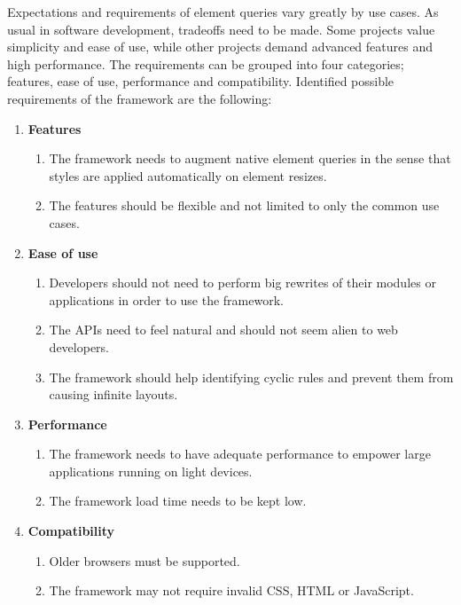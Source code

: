 \documentclass[a4paper,11pt]{kth-mag}
\begin{document}
        Expectations and requirements of element queries vary greatly by use cases.
        As usual in software development, tradeoffs need to be made.
        Some projects value simplicity and ease of use, while other projects demand advanced features and high performance.
        The requirements can be grouped into four categories; features, ease of use, performance and compatibility.
        Identified possible requirements of the framework are the following:
        \begin{enumerate}
          \item \textbf{Features}
            \begin{enumerate}
              \item\label{itm:req_resize_detect} The framework needs to augment \gls{native} element queries in the sense that styles are applied automatically on \gls{element} resizes.
              \item The features should be flexible and not limited to only the common use cases.
            \end{enumerate}
          \item \textbf{Ease of use}
            \begin{enumerate}
              \item\label{itm:req_big_rewrite} Developers should not need to perform big rewrites of their modules or applications in order to use the framework.
              \item\label{itm:natural} The \glspl{API} need to feel natural and should not seem alien to \gls{web} developers.
              \item The framework should help identifying cyclic rules and prevent them from causing infinite layouts.
            \end{enumerate}
          \item \textbf{Performance}
            \begin{enumerate}
              \item The framework needs to have adequate performance to empower large applications running on light devices.
              \item The framework load time needs to be kept low.
            \end{enumerate}
          \item \textbf{Compatibility}
            \begin{enumerate}
              \item Older \glspl{browser} must be supported.
              \item The framework may not require invalid \gls{CSS}, \gls{HTML} or \gls{JavaScript}.

\end{enumerate}
\end{enumerate}
\end{document}
